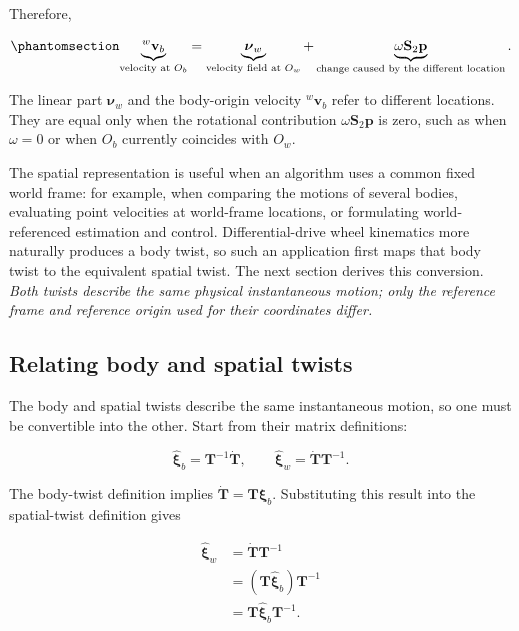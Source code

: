 \documentclass[
  australian,
  12pt,
  letterpaper,
  DIV=11,
  numbers=noendperiod,
  twoside]{scrreprt}
\begin{document}
Therefore,

\begin{equation}\protect\phantomsection\label{eq-se2-spatial-twist-body-origin-velocity}{
\underbrace{{}^w\mathbf v_b}_{\text{velocity at }O_b}
=
\underbrace{\boldsymbol\nu_w}_{\text{velocity field at }O_w}
+
\underbrace{\omega\mathbf S_2\mathbf p}_{\text{change caused by the different location}}.
}\end{equation}

The linear part \(\boldsymbol\nu_w\) and the body-origin velocity
\({}^w\mathbf v_b\) refer to different locations. They are equal only
when the rotational contribution \(\omega\mathbf S_2\mathbf p\) is zero,
such as when \(\omega=0\) or when \(O_b\) currently coincides with
\(O_w\).

The spatial representation is useful when an algorithm uses a common
fixed world frame: for example, when comparing the motions of several
bodies, evaluating point velocities at world-frame locations, or
formulating world-referenced estimation and control. Differential-drive
wheel kinematics more naturally produces a body twist, so such an
application first maps that body twist to the equivalent spatial twist.
The next section derives this conversion. \emph{Both twists describe the
same physical instantaneous motion; only the reference frame and
reference origin used for their coordinates differ.}

\subsection{Relating body and spatial
twists}\label{relating-body-and-spatial-twists}

The body and spatial twists describe the same instantaneous motion, so
one must be convertible into the other. Start from their matrix
definitions:

\[
\widehat{\boldsymbol\xi}_b
=
\mathbf T^{-1}\dot{\mathbf T},
\qquad
\widehat{\boldsymbol\xi}_w
=
\dot{\mathbf T}\mathbf T^{-1}.
\]

The body-twist definition implies
\(\dot{\mathbf T}=\mathbf T\widehat{\boldsymbol\xi}_b\). Substituting
this result into the spatial-twist definition gives

\[
\begin{aligned}
\widehat{\boldsymbol\xi}_w
&=
\dot{\mathbf T}\mathbf T^{-1}\\
&=
\left(
\mathbf T\widehat{\boldsymbol\xi}_b
\right)
\mathbf T^{-1}\\
&=
\mathbf T\widehat{\boldsymbol\xi}_b\mathbf T^{-1}.
\end{aligned}
\]
\end{document}
